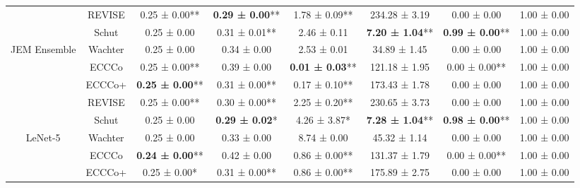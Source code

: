 \begin{table}
{\begin{tabular}[t]{cccccccc}
 & REVISE & 0.25 ± 0.00** & \textbf{0.29 ± 0.00}** & 1.78 ± 0.09** & 234.28 ± 3.19\hphantom{*}\hphantom{*} & 0.00 ± 0.00\hphantom{*}\hphantom{*} & 1.00 ± 0.00\hphantom{*}\hphantom{*}\\

 & Schut & 0.25 ± 0.00\hphantom{*}\hphantom{*} & 0.31 ± 0.01** & 2.46 ± 0.11\hphantom{*}\hphantom{*} & \textbf{7.20 ± 1.04}** & \textbf{0.99 ± 0.00}** & 1.00 ± 0.00\hphantom{*}\hphantom{*}\\

\multirow[t]{-5}{*}{\centering\arraybackslash JEM Ensemble} & Wachter & 0.25 ± 0.00\hphantom{*}\hphantom{*} & 0.34 ± 0.00\hphantom{*}\hphantom{*} & 2.53 ± 0.01\hphantom{*}\hphantom{*} & 34.89 ± 1.45\hphantom{*}\hphantom{*} & 0.00 ± 0.00\hphantom{*}\hphantom{*} & 1.00 ± 0.00\hphantom{*}\hphantom{*}\\
\cmidrule{1-8}
 & ECCCo & 0.25 ± 0.00** & 0.39 ± 0.00\hphantom{*}\hphantom{*} & \textbf{0.01 ± 0.03}** & 121.18 ± 1.95\hphantom{*}\hphantom{*} & 0.00 ± 0.00** & 1.00 ± 0.00\hphantom{*}\hphantom{*}\\

 & ECCCo+ & \textbf{0.25 ± 0.00}** & 0.31 ± 0.00** & 0.17 ± 0.10** & 173.43 ± 1.78\hphantom{*}\hphantom{*} & 0.00 ± 0.00\hphantom{*}\hphantom{*} & 1.00 ± 0.00\hphantom{*}\hphantom{*}\\

 & REVISE & 0.25 ± 0.00** & 0.30 ± 0.00** & 2.25 ± 0.20** & 230.65 ± 3.73\hphantom{*}\hphantom{*} & 0.00 ± 0.00\hphantom{*}\hphantom{*} & 1.00 ± 0.00\hphantom{*}\hphantom{*}\\

 & Schut & 0.25 ± 0.00\hphantom{*}\hphantom{*} & \textbf{0.29 ± 0.02}*\hphantom{*} & 4.26 ± 3.87*\hphantom{*} & \textbf{7.28 ± 1.04}** & \textbf{0.98 ± 0.00}** & 1.00 ± 0.00\hphantom{*}\hphantom{*}\\

\multirow[t]{-5}{*}{\centering\arraybackslash LeNet-5} & Wachter & 0.25 ± 0.00\hphantom{*}\hphantom{*} & 0.33 ± 0.00\hphantom{*}\hphantom{*} & 8.74 ± 0.00\hphantom{*}\hphantom{*} & 45.32 ± 1.14\hphantom{*}\hphantom{*} & 0.00 ± 0.00\hphantom{*}\hphantom{*} & 1.00 ± 0.00\hphantom{*}\hphantom{*}\\
\cmidrule{1-8}
 & ECCCo & \textbf{0.24 ± 0.00}** & 0.42 ± 0.00\hphantom{*}\hphantom{*} & 0.86 ± 0.00** & 131.37 ± 1.79\hphantom{*}\hphantom{*} & 0.00 ± 0.00** & 1.00 ± 0.00\hphantom{*}\hphantom{*}\\

 & ECCCo+ & 0.25 ± 0.00*\hphantom{*} & 0.31 ± 0.00** & 0.86 ± 0.00** & 175.89 ± 2.75\hphantom{*}\hphantom{*} & 0.00 ± 0.00\hphantom{*}\hphantom{*} & 1.00 ± 0.00\hphantom{*}\hphantom{*}\\


\end{tabular}}
\end{table}
